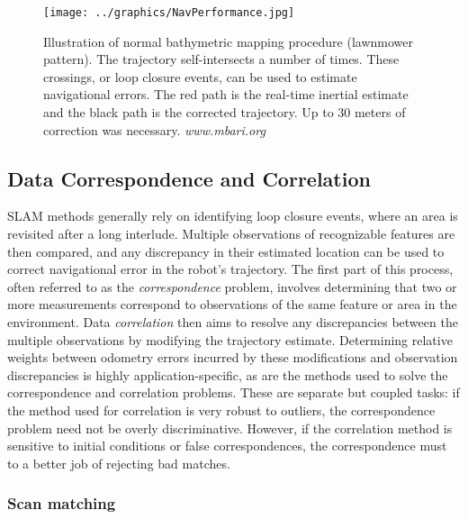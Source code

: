  \begin{figure}[htbp]
   \centering
   \texttt{[image: ../graphics/NavPerformance.jpg]} %
   \caption{Illustration of normal bathymetric mapping procedure (lawnmower pattern). The trajectory self-intersects a number of times. These crossings, or loop closure events, can be used to estimate navigational errors. The red path is the real-time inertial estimate and the black path is the corrected trajectory. Up to 30 meters of correction was necessary. \emph{www.mbari.org} }
   \label{fig:BathyMapping}
\end{figure}


\subsection{Data Correspondence and Correlation}

SLAM methods generally rely on identifying loop closure events, where an area is revisited after a long interlude. Multiple observations of recognizable features are then compared, and any discrepancy in their estimated location can be used to correct navigational error in the robot's trajectory. The first part of this process, often referred to as the \emph{correspondence} problem, involves determining that two or more measurements correspond to observations of the same feature or area in the environment. Data \emph{correlation} then aims to resolve any discrepancies between the multiple observations by modifying the trajectory estimate. Determining relative weights between odometry errors incurred by these modifications and observation discrepancies is highly application-specific, as are the methods used to solve the correspondence and correlation problems. These are separate but coupled tasks: if the method used for correlation is very robust to outliers, the correspondence problem need not be overly discriminative. However, if the correlation method is sensitive to initial conditions or false correspondences, the correspondence must to a better job of rejecting bad matches. 


\subsubsection{Scan matching}

